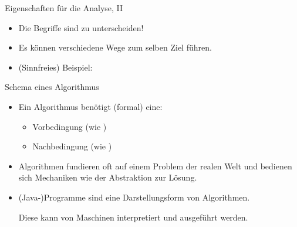 \begin{frame}{Eigenschaften für die Analyse, II}
    \bigskip
    \begin{itemize}
        \item<6-> Die Begriffe sind zu unterscheiden!
        \item<7-> Es können verschiedene Wege zum selben Ziel führen.
        \item<8-> (Sinnfreies) Beispiel: \smallskip\par
    \end{itemize}
\end{frame}


\begin{frame}{Schema eines Algorithmus}
    \pause\begin{center}
    \end{center}
    \begin{itemize}[<+(1)->]
        \widei
        \item Ein Algorithmus benötigt (formal) eine: \begin{itemize}
            \item Vorbedingung (wie )
            \item Nachbedingung (wie )
        \end{itemize}
        \item Algorithmen fundieren oft auf einem Problem der realen Welt und bedienen sich Mechaniken wie der Abstraktion zur Lösung.
        \item (Java-)Programme sind eine Darstellungsform von Algorithmen.\par\pause{}
              Diese kann von Maschinen interpretiert und ausgeführt werden.
     \end{itemize}
\end{frame}

